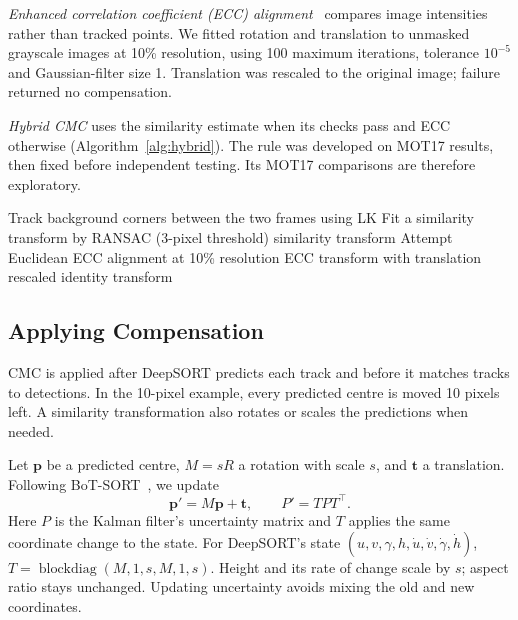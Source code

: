 \documentclass[conference]{IEEEtran}
\begin{document}
\emph{Enhanced correlation coefficient (ECC) alignment}~\cite{evangelidis2008ecc} compares image intensities rather than tracked points. We fitted rotation and translation to unmasked grayscale images at 10\% resolution, using 100 maximum iterations, tolerance $10^{-5}$ and Gaussian-filter size 1. Translation was rescaled to the original image; failure returned no compensation.

\emph{Hybrid CMC} uses the similarity estimate when its checks pass and ECC otherwise (Algorithm~\ref{alg:hybrid}). The rule was developed on MOT17 results, then fixed before independent testing. Its MOT17 comparisons are therefore exploratory.

\begin{algorithm}[t]
\caption{Hybrid camera-motion estimation (exploratory)}\label{alg:hybrid}
\footnotesize
\begin{algorithmic}[1]
\State Track background corners between the two frames using LK
  \State Fit a similarity transform by RANSAC (3-pixel threshold)
    \State \Return similarity transform
  \EndIf
\EndIf
\State Attempt Euclidean ECC alignment at 10\% resolution
  \State \Return ECC transform with translation rescaled
\EndIf
\State \Return identity transform
\end{algorithmic}
\end{algorithm}

\subsection{Applying Compensation}
CMC is applied after DeepSORT predicts each track and before it matches tracks to detections. In the 10-pixel example, every predicted centre is moved 10 pixels left. A similarity transformation also rotates or scales the predictions when needed.

Let $\mathbf{p}$ be a predicted centre, $M=sR$ a rotation with scale $s$, and $\mathbf{t}$ a translation. Following BoT-SORT~\cite{aharon2022botsort}, we update
\begin{equation}
\mathbf{p}'=M\mathbf{p}+\mathbf{t},\qquad P'=TP T^\top.
\end{equation}
Here $P$ is the Kalman filter's uncertainty matrix and $T$ applies the same coordinate change to the state. For DeepSORT's state $(u,v,\gamma,h,\dot u,\dot v,\dot\gamma,\dot h)$, $T=\operatorname{blockdiag}(M,1,s,M,1,s)$. Height and its rate of change scale by $s$; aspect ratio stays unchanged. Updating uncertainty avoids mixing the old and new coordinates.
\end{document}
